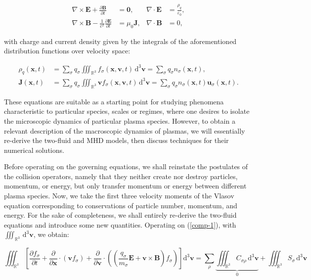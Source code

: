 \begin{align*}
    \nabla\times \mathbf{E}+\frac{\partial \mathbf{B}}{\partial t}&=\mathbf{0},&\nabla\cdot \mathbf{E}&=\frac{\rho_q}{\varepsilon_0},\\
    \nabla\times \mathbf{B}-\frac{1}{c^2}\frac{\partial \mathbf{E}}{\partial t}&=\mu_0 \mathbf{J},&\nabla\cdot \mathbf{B}&=0,
\end{align*}

with charge and current density given by the integrals of the aforementioned distribution functions over velocity space:

\begin{align*}
    \rho_q(\mathbf{x},t)&=\sum_{\sigma}q_\sigma\iiint_{\mathbb{R}^3}f_\sigma(\mathbf{x},\mathbf{v},t)\,\mathrm{d}^3 \mathbf{v}=\sum_{\sigma}q_\sigma n_\sigma(\mathbf{x},t),\\
    \mathbf{J}(\mathbf{x},t)&=\sum_{\sigma}q_\sigma\iiint_{\mathbb{R}^3}\mathbf{v}f_{\sigma}(\mathbf{x},\mathbf{v},t)\,\mathrm{d}^3 \mathbf{v}=\sum_{\sigma}q_\sigma n_\sigma(\mathbf{x},t) \mathbf{u}_{\sigma}(\mathbf{x},t).
\end{align*}

These equations are suitable as a starting point for studying phenomena characteristic to particular species, scales or regimes, where one desires to isolate the microscopic dynamics of particular plasma species. However, to obtain a relevant description of the macroscopic dynamics of plasmas, we will essentially re-derive the two-fluid and MHD models, then discuss techniques for their numerical solutions.

\vspace*{2.5pt}

\quad Before operating on the governing equations, we shall reinstate the postulates of the collision operators, namely that they neither create nor destroy particles, momentum, or energy, but only transfer momentum or energy between different plasma species. Now, we take the first three velocity moments of the Vlasov equation corresponding to conservations of particle number, momentum, and energy. For the sake of completeness, we shall entirely re-derive the two-fluid equations and introduce some new quantities. Operating on (\ref{comp-1}), with $\iiint_{\mathbb{R}^3}\,\mathrm{d}^3\mathbf{v}$, we obtain:

\begin{equation*}
    \iiint_{\mathbb{R}^3}\left[\frac{\partial f_\sigma}{\partial t}+\frac{\partial}{\partial \mathbf{x}}\cdot \left(\mathbf{v}f_\sigma\right)+\frac{\partial}{\partial \mathbf{v}}\cdot \left(\left(\frac{q_\sigma}{m_\sigma}\mathbf{E}+\mathbf{v}\times \mathbf{B}\right)f_\sigma\right)\right]\mathrm{d}^3 \mathbf{v}=\sum_{\rho}\underbrace{\iiint_{\mathbb{R}^3}C_{\sigma\rho}\,\mathrm{d}^3 \mathbf{v}}_{0}+\iiint_{\mathbb{R}^3}S_\sigma\,\mathrm{d}^3 \mathbf{v}
\end{equation*}

